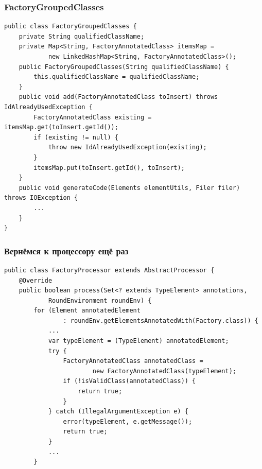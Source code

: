 \documentclass[xetex,mathserif,serif]{beamer}
\begin{document}
	\begin{frame}[fragile]
		\frametitle{FactoryGroupedClasses}
		\begin{footnotesize}
			\begin{verbatim}
public class FactoryGroupedClasses {
    private String qualifiedClassName;
    private Map<String, FactoryAnnotatedClass> itemsMap =
            new LinkedHashMap<String, FactoryAnnotatedClass>();
    public FactoryGroupedClasses(String qualifiedClassName) {
        this.qualifiedClassName = qualifiedClassName;
    }
    public void add(FactoryAnnotatedClass toInsert) throws IdAlreadyUsedException {
        FactoryAnnotatedClass existing = itemsMap.get(toInsert.getId());
        if (existing != null) {
            throw new IdAlreadyUsedException(existing);
        }
        itemsMap.put(toInsert.getId(), toInsert);
    }
    public void generateCode(Elements elementUtils, Filer filer) throws IOException {
        ...
    }
}
			\end{verbatim}
		\end{footnotesize}
	\end{frame}

	\begin{frame}[fragile]
		\frametitle{Вернёмся к процессору ещё раз}
		\begin{footnotesize}
			\begin{verbatim}
public class FactoryProcessor extends AbstractProcessor {
    @Override
    public boolean process(Set<? extends TypeElement> annotations, 
            RoundEnvironment roundEnv) {
        for (Element annotatedElement 
                : roundEnv.getElementsAnnotatedWith(Factory.class)) {
            ...
            var typeElement = (TypeElement) annotatedElement;
            try {
                FactoryAnnotatedClass annotatedClass =
                        new FactoryAnnotatedClass(typeElement); 
                if (!isValidClass(annotatedClass)) {
                    return true; 
                }
            } catch (IllegalArgumentException e) {
                error(typeElement, e.getMessage());
                return true;
            }
            ...
        }
			\end{verbatim}
		\end{footnotesize}
	\end{frame}
\end{document}
